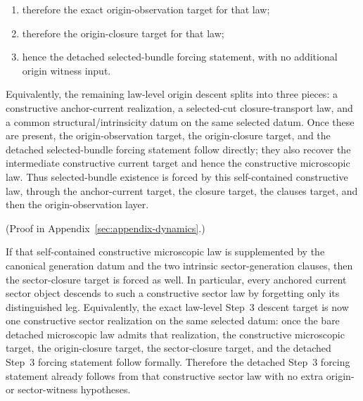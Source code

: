 \begin{theorem}
\begin{enumerate}
      origin-observation clauses target for that law;
\item therefore the exact origin-observation target for that law;
\item therefore the origin-closure target for that law;
\item hence the detached selected-bundle forcing statement, with no additional
      origin witness input.
\end{enumerate}
Equivalently, the remaining law-level origin descent splits into three pieces:
a constructive anchor-current realization, a selected-cut closure-transport
law, and a common structural/intrinsicity datum on the same selected datum.
Once these are present, the origin-observation target, the origin-closure
target, and the detached selected-bundle forcing statement follow directly;
they also recover the intermediate constructive current target and hence the
constructive microscopic law. Thus selected-bundle existence is forced by this
self-contained constructive law, through the anchor-current target, the
closure target, the clauses target, and then the origin-observation layer.
\end{theorem}

(Proof in Appendix~\ref{sec:appendix-dynamics}.)

\begin{corollary}
\label{cor:constructive-sector-law-forces-sector-closure}
If that self-contained constructive microscopic law is supplemented by the
canonical generation datum and the two intrinsic sector-generation clauses,
then the sector-closure target is forced as well. In particular, every
anchored current sector object descends to such a constructive sector law by
forgetting only its distinguished leg.
Equivalently, the exact law-level Step~3 descent target is now one
constructive sector realization on the same selected datum: once the bare
detached microscopic law admits that realization, the constructive microscopic
target, the origin-closure target, the sector-closure target, and the detached
Step~3 forcing statement follow formally.
Therefore the detached Step~3 forcing statement already follows from that
constructive sector law with no extra origin- or sector-witness hypotheses.
\end{corollary}

